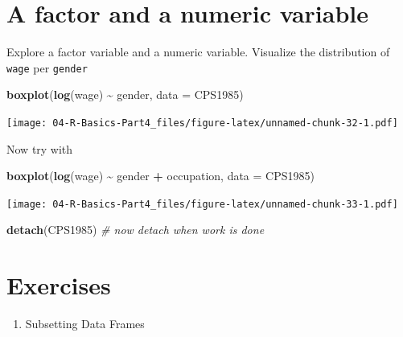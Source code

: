 \documentclass[
]{book}
\newenvironment{Shaded}{\begin{snugshade}}{\end{snugshade}}
\newcommand{\AttributeTok}[1]{\textcolor[rgb]{0.13,0.29,0.53}{#1}}
\newcommand{\CommentTok}[1]{\textcolor[rgb]{0.56,0.35,0.01}{\textit{#1}}}
\newcommand{\FunctionTok}[1]{\textcolor[rgb]{0.13,0.29,0.53}{\textbf{#1}}}
\newcommand{\NormalTok}[1]{#1}
\newcommand{\SpecialCharTok}[1]{\textcolor[rgb]{0.81,0.36,0.00}{\textbf{#1}}}
\providecommand{\tightlist}{%
  \setlength{\itemsep}{0pt}\setlength{\parskip}{0pt}}
\begin{document}
\section*{A factor and a numeric variable}\label{a-factor-and-a-numeric-variable}

Explore a factor variable and a numeric variable.
Visualize the distribution of \texttt{wage} per \texttt{gender}

\begin{Shaded}
\begin{Highlighting}[]
\FunctionTok{boxplot}\NormalTok{(}\FunctionTok{log}\NormalTok{(wage) }\SpecialCharTok{\textasciitilde{}}\NormalTok{ gender, }\AttributeTok{data =}\NormalTok{ CPS1985)}
\end{Highlighting}
\end{Shaded}

\texttt{[image: 04-R-Basics-Part4\_files/figure-latex/unnamed-chunk-32-1.pdf]}

Now try with

\begin{Shaded}
\begin{Highlighting}[]
\FunctionTok{boxplot}\NormalTok{(}\FunctionTok{log}\NormalTok{(wage) }\SpecialCharTok{\textasciitilde{}}\NormalTok{ gender }\SpecialCharTok{+}\NormalTok{ occupation, }\AttributeTok{data =}\NormalTok{ CPS1985)}
\end{Highlighting}
\end{Shaded}

\texttt{[image: 04-R-Basics-Part4\_files/figure-latex/unnamed-chunk-33-1.pdf]}

\begin{Shaded}
\begin{Highlighting}[]
\FunctionTok{detach}\NormalTok{(CPS1985) }\CommentTok{\# now detach when work is done}
\end{Highlighting}
\end{Shaded}

\section*{Exercises}\label{exercises}

\begin{enumerate}
\def\labelenumi{\arabic{enumi}.}
\tightlist
\item
  Subsetting Data Frames
\end{enumerate}
\end{document}
